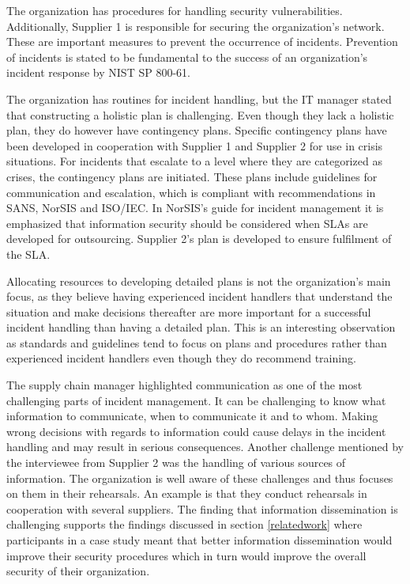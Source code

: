The organization has procedures for handling security vulnerabilities. Additionally, Supplier 1 is responsible for securing the organization's network. These are important measures to prevent the occurrence of incidents. Prevention of incidents is stated to be fundamental to the success of an organization's incident response by NIST SP 800-61. 

The organization has routines for incident handling, but the IT manager stated that constructing a holistic plan is challenging. Even though they lack a holistic plan, they do however have contingency plans. Specific contingency plans have been developed in cooperation with Supplier 1 and Supplier 2 for use in crisis situations. For incidents that escalate to a level where they are categorized as crises, the contingency plans are initiated. These plans include guidelines for communication and escalation, which is compliant with recommendations in SANS, NorSIS and ISO/IEC. In NorSIS's guide for incident management it is emphasized that information security should be considered when \acp{SLA} are developed for outsourcing. Supplier 2's plan is developed to ensure fulfilment of the \ac{SLA}. 

Allocating resources to developing detailed plans is not the organization's main focus, as they believe having experienced incident handlers that understand the situation and make decisions thereafter are more important for a successful incident handling than having a detailed plan. This is an interesting observation as standards and guidelines tend to focus on plans and procedures rather than experienced incident handlers even though they do recommend training. 

The supply chain manager highlighted communication as one of the most challenging parts of incident management. It can be challenging to know what information to communicate, when to communicate it and to whom. Making wrong decisions with regards to information could cause delays in the incident handling and may result in serious consequences. Another challenge mentioned by the interviewee from Supplier 2 was the handling of various sources of information. The organization is well aware of these challenges and thus focuses on them in their rehearsals. An example is that they conduct rehearsals in cooperation with several suppliers. The finding that information dissemination is challenging supports the findings discussed in section \ref{relatedwork} where participants in a case study meant that better information dissemination would improve their security procedures which in turn would improve the overall security of their organization. 

